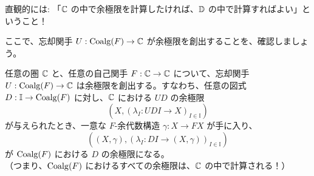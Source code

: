 \documentclass[
		head_space=20mm,
		foot_space=20mm,
		gutter=10mm,
		line_length=190mm
]{jlreq}
\begin{document}
\noindent 直観的には: 「$\mathbb{C}$ の中で余極限を計算したければ、$\mathbb{D}$ の中で計算すればよい」ということ！\vspace{5pt}

\noindent ここで、忘却関手 $U:\mathrm{Coalg}(F)\to\mathbb{C}$ が余極限を創出することを、確認しましょう。

\begin{theorem}
	任意の圏 $\mathbb{C}$ と、任意の自己関手 $F:\mathbb{C}\to\mathbb{C}$ について、忘却関手 $U:\mathrm{Coalg}(F)\to\mathbb{C}$ は余極限を創出する。すなわち、任意の図式 $D:\mathbb I\to\mathrm{Coalg}(F)$ に対し、$\mathbb{C}$ における $UD$ の余極限 \[(X,(\lambda_I:UDI\to X)_{I\in\mathbb I})\] が与えられたとき、一意な $F$-余代数構造 $\gamma:X\to FX$ が手に入り、\[((X,\gamma),(\lambda_I:DI\to(X,\gamma))_{I\in\mathbb I})\]
	が $\mathrm{Coalg}(F)$ における $D$ の余極限になる。
	\\
	（つまり、$\mathrm{Coalg}(F)$ におけるすべての余極限は、$\mathbb{C}$ の中で計算される！）
\end{theorem}
\end{document}
